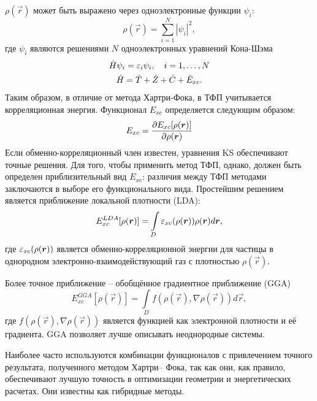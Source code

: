 \( \rho(\vec{r}) \)  может быть выражено через одноэлектронные функции \( \psi_i \):
\begin{equation}
    \rho(\vec{r}) = \sum_{i=1}^N |\psi_i|^2,
\end{equation}
где \(\psi_i\) являются решениями \( N \) одноэлектронных уравнений Кона-Шэма
\begin{gather}
    \hat{H}\psi_i = \varepsilon_i\psi_i,\quad i=1,\ldots,N\\
    \hat{H} = \hat{T} + \hat{Z} + \hat{C} + \hat{E}_{xc}.
\end{gather}
Таким образом, в отличие от метода Хартри-Фока, в ТФП учитывается корреляционная энергия. Функционал \(E_{xc}\) определяется следующим образом:
\begin{equation}
    E_{xc} = \frac{\partial E_{xc}[\rho(\boldsymbol{r})]}{\partial \rho(\boldsymbol{r})}
\end{equation}
Если обменно-корреляционный член известен, уравнения KS обеспечивают точные решения. Для того, чтобы применить метод ТФП, однако, должен быть определен приблизительный вид \(E_{xc}\): различия между ТФП методами заключаются в выборе его функционального вида. Простейшим решением является приближение локальной плотности (LDA):
\begin{equation}
    E_{xc}^{LDA}[\rho(\boldsymbol{r})] = \int\limits_{D}\varepsilon_{xc}(\rho(\boldsymbol{r}))\rho(\boldsymbol{r}) d\boldsymbol{r},
\end{equation}
где \(\varepsilon_{xc}(\rho(\boldsymbol{r}))\) является обменно-корреляционной энергии для частицы в однородном электронно-взаимодействующий газ с плотностью \(\rho(\vec{r})\).

Более точное приближение -- обобщённое градиентное приближение (GGA)
\begin{equation}
    E_{xc}^{GGA}[\rho(\vec{r})] = \int\limits_{D}f(\rho(\vec{r}), \nabla\rho(\vec{r})) d\vec{r},
\end{equation}
где \( f(\rho(\vec{r}), \nabla\rho(\vec{r})) \) является функцией как электронной плотности и её градиента. GGA позволяет лучше описывать неоднородные системы.

Наиболее часто используются комбинации функционалов с привлечением точного результата, полученного методом Хартри-- Фока, так как они, как правило, обеспечивают лучшую точность в оптимизации геометрии и энергетических расчетах. Они известны как гибридные методы.